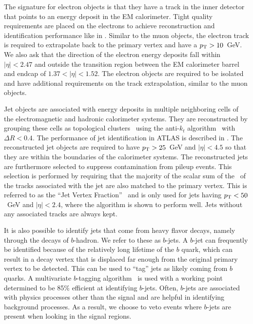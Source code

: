 The signature for electron objects is that they have a track in the inner
detector that points to an energy deposit in the EM calorimeter.
Tight quality requirements are placed on the electrons to achieve
reconstruction and identification performance like in \cite{Aad:1744017}.
Similar to the muon objects, 
the electron track is required to extrapolate back to 
the primary vertex and have a $p_{\mathrm{T}}>10$~GeV.
We also ask that the direction of the electron energy 
deposits fall within $|\eta| < 2.47$ and outside the 
transition region between the EM calorimeter 
barrel and endcap of $1.37 < |\eta| < 1.52$.
The electron objects are required to be isolated and have additional
requirements on the track extrapolation, similar to the muon objects.  


Jet objects are associated with energy deposits in multiple 
neighboring cells of the electromagnetic and hadronic calorimeter systems.
They are reconstructed by grouping these cells
as topological clusters~\cite{Lampl:1099735}
using the anti-$k_t$ algorithm~\cite{Cacciari:2008gp} with $\Delta R < 0.4$.
The performance of jet identification in ATLAS is described in \cite{Aad:2016upy}.
The reconstructed jet objects are required to have 
$p_{\mathrm{T}}>25$~GeV and $|\eta|<4.5$ so that
they are within the boundaries of the calorimeter systems.
The reconstructed jets are furthermore selected to suppress 
contamination from pileup events. This selection is performed by 
requiring that the majority of the
scalar sum of the \pt~of the tracks associated with the 
jet are also matched to the primary vertex. This is referred to
as the ``Jet Vertex Fraction''~\cite{Miller:1206864, ATLAS-CONF-2013-083}
and is only used for jets having $p_{\mathrm{T}} < 50$~GeV and $|\eta|<2.4$, where
the algorithm is shown to perform well. Jets without any associated
tracks are always kept. 

It is also possible to identify jets that come from heavy flavor
decays, namely through the decays of $b$-hadron. We refer
to these as $b$-jets. A $b$-jet can frequently be identified 
because of the relatively long lifetime of the $b$ quark, which can 
result in a decay vertex that is displaced far enough
from the original primary vertex to be detected.
This can be used to ``tag'' jets as likely coming from
$b$ quarks. A multivariate $b$-tagging algorithm~\cite{ATLAS-CONF-2014-004}
is used with a working point determined to be 85\% efficient at
identifying $b$-jets. %
Often, $b$-jets are associated with physics processes other than the signal
and are helpful in identifying background processes.
As a result, we choose to veto events where 
$b$-jets are present when looking in the signal regions.


